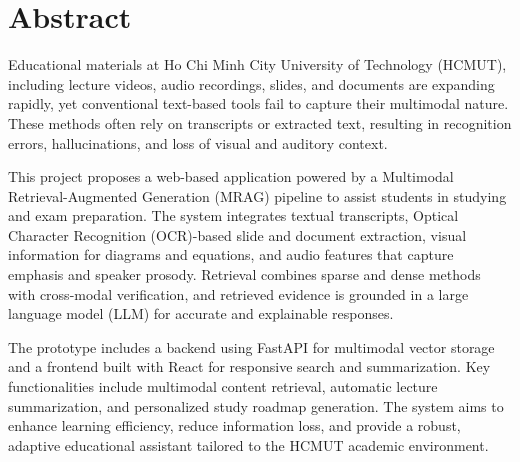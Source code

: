 \chapter*{Abstract}

Educational materials at Ho Chi Minh City University of Technology (HCMUT), including lecture videos, audio recordings, slides, and documents are expanding rapidly, yet conventional text-based tools fail to capture their multimodal nature. These methods often rely on transcripts or extracted text, resulting in recognition errors, hallucinations, and loss of visual and auditory context.

This project proposes a web-based application powered by a Multimodal Retrieval-Augmented Generation (MRAG) pipeline to assist students in studying and exam preparation. The system integrates textual transcripts, Optical Character Recognition (OCR)-based slide and document extraction, visual information for diagrams and equations, and audio features that capture emphasis and speaker prosody. Retrieval combines sparse and dense methods with cross-modal verification, and retrieved evidence is grounded in a large language model (LLM) for accurate and explainable responses.

The prototype includes a backend using FastAPI for multimodal vector storage and a frontend built with React for responsive search and summarization. Key functionalities include multimodal content retrieval, automatic lecture summarization, and personalized study roadmap generation. The system aims to enhance learning efficiency, reduce information loss, and provide a robust, adaptive educational assistant tailored to the HCMUT academic environment.

\newpage
